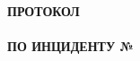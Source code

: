 \begin{center}
{\large \textbf{ПРОТОКОЛ \varTitle{} }} \\
\vspace{1cm} \\
{\large \textbf{ПО ИНЦИДЕНТУ № \varIdx{} }} \\
\end{center}
